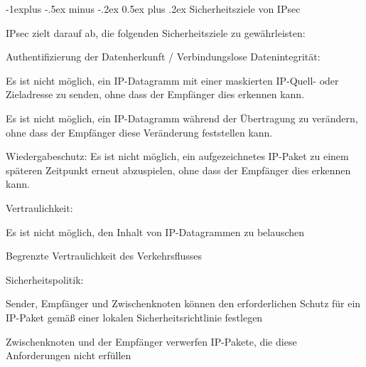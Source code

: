 \documentclass[a4paper]{article}
\makeatletter
\renewcommand{\subsection}{\@startsection{subsection}{2}{0mm}%
 {-1explus -.5ex minus -.2ex}%
 {0.5ex plus .2ex}%
 {\normalfont\normalsize\bfseries}}
\makeatother
\begin{document}
\begin{multicols}{3}
      \subsection{Sicherheitsziele von IPsec}
      \begin{itemize*}
            \item IPsec zielt darauf ab, die folgenden Sicherheitsziele zu gewährleisten:
            \begin{itemize*}
                  \item Authentifizierung der Datenherkunft / Verbindungslose Datenintegrität:
                  \begin{itemize*}
                        \item Es ist nicht möglich, ein IP-Datagramm mit einer maskierten IP-Quell- oder Zieladresse zu senden, ohne dass der Empfänger dies erkennen kann.
                        \item Es ist nicht möglich, ein IP-Datagramm während der Übertragung zu verändern, ohne dass der Empfänger diese Veränderung feststellen kann.
                        \item Wiedergabeschutz: Es ist nicht möglich, ein aufgezeichnetes IP-Paket zu einem späteren Zeitpunkt erneut abzuspielen, ohne dass der Empfänger dies erkennen kann.
                  \end{itemize*}
                  \item Vertraulichkeit:
                  \begin{itemize*}
                        \item Es ist nicht möglich, den Inhalt von IP-Datagrammen zu belauschen
                        \item Begrenzte Vertraulichkeit des Verkehrsflusses
                  \end{itemize*}
            \end{itemize*}
            \item Sicherheitspolitik:
            \begin{itemize*}
                  \item Sender, Empfänger und Zwischenknoten können den erforderlichen Schutz für ein IP-Paket gemäß einer lokalen Sicherheitsrichtlinie festlegen
                  \item Zwischenknoten und der Empfänger verwerfen IP-Pakete, die diese Anforderungen nicht erfüllen
            \end{itemize*}
      \end{itemize*}


\end{multicols}
\end{document}
